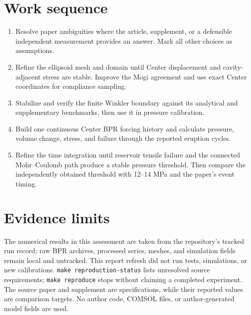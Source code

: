 \documentclass[10pt]{article}
\begin{document}
\section*{Work sequence}
\begin{enumerate}
  \item Resolve paper ambiguities where the article, supplement, or a
        defensible independent measurement provides an answer. Mark all other
        choices as assumptions.
  \item Refine the ellipsoid mesh and domain until Center displacement and
        cavity-adjacent stress are stable. Improve the Mogi agreement and use
        exact Center coordinates for compliance sampling.
  \item Stabilize and verify the finite Winkler boundary against its analytical
        and supplementary benchmarks, then use it in pressure calibration.
  \item Build one continuous Center BPR forcing history and calculate pressure,
        volume change, stress, and failure through the reported eruption
        cycles.
  \item Refine the time integration until reservoir tensile failure and the
        connected Mohr--Coulomb path produce a stable pressure threshold. Then
        compare the independently obtained threshold with 12--14 MPa and the
        paper's event timing.
\end{enumerate}

\section*{Evidence limits}
The numerical results in this assessment are taken from the repository's
tracked run record; raw BPR archives, processed series, meshes, and simulation
fields remain local and untracked. This report refresh did not run tests,
simulations, or new calibrations. \texttt{make reproduction-status} lists
unresolved source requirements; \texttt{make reproduce} stops without claiming
a completed experiment. The source paper and
supplement are specifications, while their reported values are comparison
targets. No author code, COMSOL files, or author-generated model fields are
used.
\end{document}
